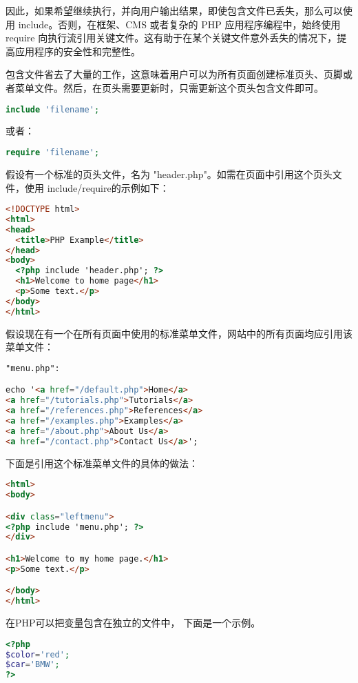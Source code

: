 因此，如果希望继续执行，并向用户输出结果，即使包含文件已丢失，那么可以使用 include。否则，在框架、CMS 或者复杂的 PHP 应用程序编程中，始终使用 require 向执行流引用关键文件。这有助于在某个关键文件意外丢失的情况下，提高应用程序的安全性和完整性。

包含文件省去了大量的工作，这意味着用户可以为所有页面创建标准页头、页脚或者菜单文件。然后，在页头需要更新时，只需更新这个页头包含文件即可。

\begin{lstlisting}[language=PHP]
include 'filename';
\end{lstlisting}

或者：

\begin{lstlisting}[language=PHP]
require 'filename';
\end{lstlisting}


假设有一个标准的页头文件，名为 "header.php"。如需在页面中引用这个页头文件，使用 include/require的示例如下：


\begin{lstlisting}[language=HTML]
<!DOCTYPE html>
<html>
<head>
  <title>PHP Example</title>
</head>
<body>
  <?php include 'header.php'; ?>
  <h1>Welcome to home page</h1>
  <p>Some text.</p>
</body>
</html>
\end{lstlisting}

假设现在有一个在所有页面中使用的标准菜单文件，网站中的所有页面均应引用该菜单文件：

\begin{lstlisting}[language=HTML]
"menu.php":

echo '<a href="/default.php">Home</a>
<a href="/tutorials.php">Tutorials</a>
<a href="/references.php">References</a>
<a href="/examples.php">Examples</a>
<a href="/about.php">About Us</a>
<a href="/contact.php">Contact Us</a>';
\end{lstlisting}

下面是引用这个标准菜单文件的具体的做法：

\begin{lstlisting}[language=HTML]
<html>
<body>

<div class="leftmenu">
<?php include 'menu.php'; ?>
</div>

<h1>Welcome to my home page.</h1>
<p>Some text.</p>

</body>
</html>
\end{lstlisting}

在PHP可以把变量包含在独立的文件中， 下面是一个示例。

\begin{lstlisting}[language=PHP]
<?php
$color='red';
$car='BMW';
?>
\end{lstlisting}


